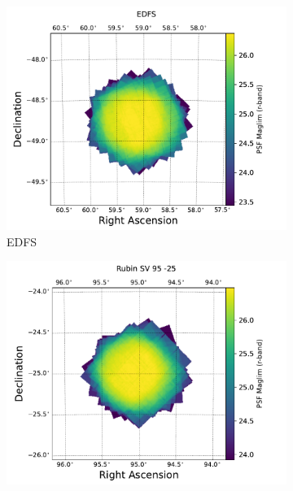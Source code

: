 \begin{figure}[htbp]
    \vspace{1em}  %
    
    \begin{subfigure}[b]{0.3\textwidth}
        \centering
        \includegraphics[width=\textwidth]{figures/comcam_psf_maglim_edfs_r.pdf}
        \caption{EDFS}
        \label{fig:img6}
    \end{subfigure}
    \hfill
    \begin{subfigure}[b]{0.3\textwidth}
        \centering
        \includegraphics[width=\textwidth]{figures/comcam_psf_maglim_rubin_sv_95_-25_r.pdf}

\end{subfigure}
\end{figure}
